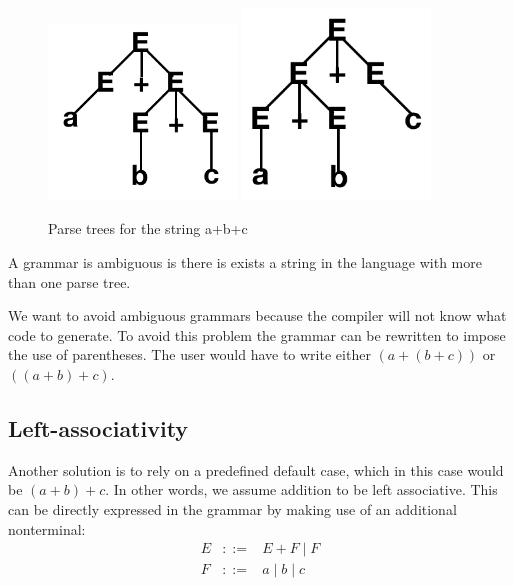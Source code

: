 \documentclass{article}
\begin{document}
\begin{figure}
  \centering
   \includegraphics[width=5cm]{right_associative_parse_tree.png}
    \includegraphics[width=5cm]{left_associative_parse_tree.png}
\caption{Parse trees for the string a+b+c}
  \label{parsetreearith}
\end{figure}

\begin{definition}
A grammar is ambiguous is there is exists a string in the language with more than one parse tree. 
\end{definition}

We want to avoid ambiguous grammars because the compiler will not know what code to generate.
\newline\newline
To avoid this problem the grammar can be rewritten to impose  the use of parentheses. The user would have to write
either $(a+(b+c))$ or $((a+b)+c)$.


\subsection*{Left-associativity}
Another solution is to rely on a predefined default case, which in this case would be $(a+b)+c$. In other words, 
we assume addition to be left associative. This can be directly expressed in the grammar by making use of an additional nonterminal:
$$\begin{array}{lll}
E  & ::= &  E + F \mid F \\
F & ::= & a \mid b \mid  c
\end{array}$$
\end{document}
